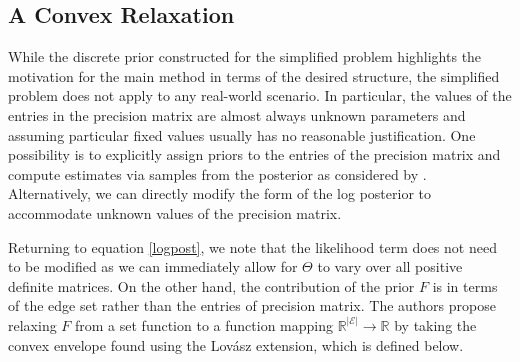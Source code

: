\documentclass{uwstat572}
\theoremstyle{remark}
\theoremstyle{definition}
\begin{document}
\subsection{A Convex Relaxation}

While the discrete prior constructed for the simplified problem highlights the motivation for the main method in terms of the desired structure, the simplified problem does not apply to any real-world scenario.  In particular, the values of the entries in the precision matrix are almost always unknown parameters and assuming particular fixed values usually has no reasonable justification.  One possibility is to explicitly assign priors to the entries of the precision matrix and compute estimates via samples from the posterior as considered by \cite{sheridan2010}.  Alternatively, we can directly modify the form of the log posterior to accommodate unknown values of the precision matrix.  

Returning to equation \eqref{logpost}, we note that the likelihood term does not need to be modified as we can immediately allow for $\Theta$ to vary over all positive definite matrices.  On the other hand, the contribution of the prior $F$ is in terms of the edge set rather than the entries of precision matrix.  The authors propose relaxing $F$ from a set function to a function mapping $\mathbb{R}^{|\mathcal{E}|} \to \mathbb{R}$ by taking the convex envelope found using the Lov{\'a}sz extension, which is defined below.
\end{document}
